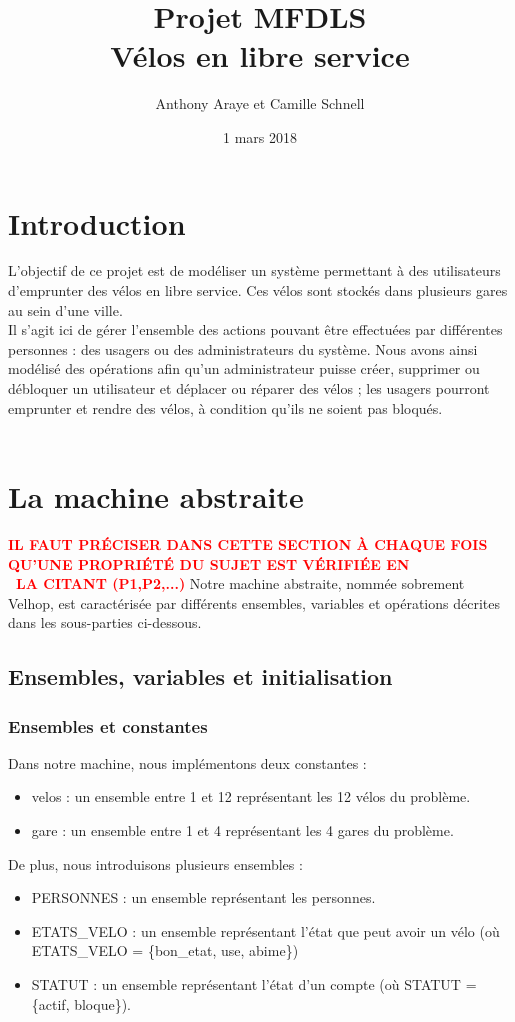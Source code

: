 \documentclass[12pt]{article}
\title{Projet MFDLS \\ Vélos en libre service}
\author{Anthony Araye et Camille Schnell}
\date{1 mars 2018}
\begin{document}
\maketitle
\newpage
\renewcommand{\contentsname}{Sommaire}
\tableofcontents
\newpage
\section{Introduction}
L'objectif de ce projet est de modéliser un système permettant à des utilisateurs d'emprunter des vélos en libre service. Ces vélos sont stockés dans plusieurs gares au sein d'une ville. \\

Il s'agit ici de gérer l'ensemble des actions pouvant être effectuées par différentes personnes : des usagers ou des administrateurs du système. Nous avons ainsi modélisé des opérations afin qu'un administrateur puisse créer, supprimer ou débloquer un utilisateur et déplacer ou réparer des vélos ; les usagers pourront emprunter et rendre des vélos, à condition qu'ils ne soient pas bloqués. \\ \\
\newpage
\section{La machine abstraite}
\textcolor{red}{\textbf{IL FAUT PRÉCISER DANS CETTE SECTION À CHAQUE FOIS QU'UNE PROPRIÉTÉ DU SUJET EST VÉRIFIÉE EN \\ LA CITANT (P1,P2,...)}}
Notre machine abstraite, nommée sobrement Velhop, est caractérisée par différents ensembles, variables et opérations décrites dans les sous-parties ci-dessous.
\subsection{Ensembles, variables et initialisation}
\subsubsection{Ensembles et constantes}
Dans notre machine, nous implémentons deux constantes :
\begin{itemize}
  \item velos : un ensemble entre 1 et 12 représentant les 12 vélos du problème.
  \item gare : un ensemble entre 1 et 4 représentant les 4 gares du problème.
\end{itemize}

De plus, nous introduisons plusieurs ensembles :
\begin{itemize}
  \item PERSONNES : un ensemble représentant les personnes.
  \item ETATS\_VELO : un ensemble représentant l'état que peut avoir un vélo (où ETATS\_VELO = \{bon\_etat, use, abime\})
  \item STATUT : un ensemble représentant l'état d'un compte (où STATUT = \{actif, bloque\}).
\end{itemize}
\end{document}

